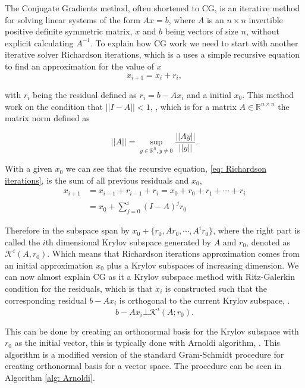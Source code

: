The Conjugate Gradients method, often shortened to CG, is an iterative method for solving linear systems of the form \(Ax=b\), where \(A\) is an \(n\times n\) invertible positive definite symmetric matrix, \(x\) and \(b\) being vectors of size \(n\), without explicit calculating \(A^{-1}\). 
To explain how CG work we need to start with another iterative solver Richardson iterations, which is a uses a simple recursive equation to find an approximation for the value of \(x\)
\begin{equation}\label{eq: Richardson iterations}
    x_{i+1}=x_i+r_i,
\end{equation}

\noindent with \(r_i\) being the residual defined as \(r_i=b-Ax_i\) and a initial \(x_0\). This method work on the condition that \(||I-A||<1\), \cite{Vorst03}, which is for a matrix \(A\in \mathbb{R}^{n\times n}\) the matrix norm defined as

\begin{equation*}
    ||A||=\sup_{y\in \mathbb{R}^n,y\ne 0}\frac{||Ay||}{||y||}.
\end{equation*}

\noindent With a given \(x_0\) we can see that the recursive equation, \eqref{eq: Richardson iterations}, is the sum of all previous residuals and \(x_0\), \cite{Vorst03}
\begin{align*}
    x_{i+1}&=x_{i-1}+r_{i-1}+r_i=x_0+r_0+r_1+\cdots +r_i\\
    &=x_0+\sum_{j=0}^{i}(I-A)^jr_0
\end{align*}

Therefore in the subspace span by \(x_0+\{r_0,Ar_0,\cdots,A^ir_0\}\), where the right part is called the \(i\)th dimensional Krylov subspace generated by \(A\) and \(r_0\), denoted as \(\mathcal{K}^i(A,r_0)\). Which means that Richardson iterations approximation comes from an initial approximation \(x_0\) plus a Krylov subspaces of increasing dimension. We can now almost explain CG as it a Krylov subspace method with Ritz-Galerkin condition for the residuals, which is that \(x_i\) is constructed such that the corresponding residual \(b-Ax_i\) is orthogonal to the current Krylov subspace, \cite{Vorst03}. 
\begin{equation}\label{eq: Ritz-Galerkin}
    b-Ax_i\bot\mathcal{K}^i(A;r_0).
\end{equation}

This can be done by creating an orthonormal basis for the Krylov subspace with \(r_0\) as the initial vector, this is typically done with Arnoldi algorithm, \cite{Saad2003}. This algorithm is a modified version of the standard Gram-Schmidt procedure for creating orthonormal basis for a vector space. The procedure can be seen in Algorithm \ref{alg: Arnoldi}.

